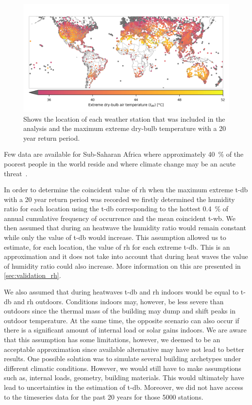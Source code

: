 \begin{figure}[thb!]
    \centering
    \includegraphics[width=\textwidth]{figures/world-map}
    \caption{Shows the location of each weather station that was included in the analysis and the maximum extreme dry-bulb temperature with a 20 year return period.}
    \label{fig:world-map}
\end{figure}

Few data are available for Sub-Saharan Africa where approximately 40~\% of the poorest people in the world reside and where climate change may be an acute threat~\cite{PovertyO1:online}.

In order to determine the coincident value of \ac{rh} when the maximum extreme \ac{t-db} with a 20 year return period was recorded we firstly determined the humidity ratio for each location using the \ac{t-db} corresponding to the hottest 0.4~\% of annual cumulative frequency of occurrence and the mean coincident \ac{t-wb}.
We then assumed that during an heatwave the humidity ratio would remain constant while only the value of \ac{t-db} would increase.
This assumption allowed us to estimate, for each location, the value of \ac{rh} for each extreme \ac{t-db}.
This is an approximation and it does not take into account that during heat waves the value of humidity ratio could also increase.
More information on this are presented in \ref{sec:validation_rh}.

We also assumed that during heatwaves \ac{t-db} and \ac{rh} indoors would be equal to \ac{t-db} and \ac{rh} outdoors.
Conditions indoors may, however, be less severe than outdoors since the thermal mass of the building may dump and shift peaks in outdoor temperature.
At the same time, the opposite scenario can also occur if there is a significant amount of internal load or solar gains indoors.
We are aware that this assumption has some limitations, however, we deemed to be an acceptable approximation since available alternative may have not lead to better results.
One possible solution was to simulate several building archetypes under different climatic conditions.
However, we would still have to make assumptions such as, internal loads, geometry, building materials.
This would ultimately have lead to uncertainties in the estimation of \ac{t-db}.
Moreover, we did not have access to the timeseries data for the past 20 years for those 5000 stations.

